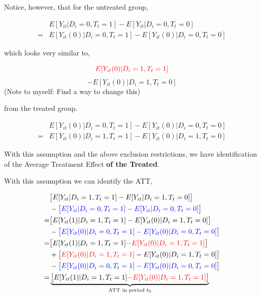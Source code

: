 \documentclass[
  letterpaper,
  DIV=11,
  numbers=noendperiod]{scrreprt}
\theoremstyle{definition}
\theoremstyle{remark}
\begin{document}
\begin{enumerate}
  Notice, however, that for the untreated group,

  \[
  \begin{aligned}
  &E[Y_{it}|D_i=0,T_t=1]-E[Y_{it}|D_i=0,T_t=0] \\
  =&E[Y_{it}(0)|D_i=0,T_t=1]-E[Y_{it}(0)|D_i=0,T_t=0]
  \end{aligned}
  \]

  which looks very similar to,

  \[
  \color{red}{E[Y_{it}(0)|D_i=1,T_t=1]}
  \] \[
  -E[Y_{it}(0)|D_i=1,T_t=0]
  \] (Note to myself: Find a way to change this)

  from the treated group.

  \begin{tcolorbox}[enhanced jigsaw, bottomrule=.15mm, coltitle=black, arc=.35mm, left=2mm, opacityback=0, leftrule=.75mm, colbacktitle=quarto-callout-note-color!10!white, title={Parallel Trends Assumption (General version)}, toprule=.15mm, bottomtitle=1mm, breakable, colframe=quarto-callout-note-color-frame, opacitybacktitle=0.6, titlerule=0mm, colback=white, rightrule=.15mm, toptitle=1mm]

  \[
  \begin{aligned}
  &E[Y_{it}(0)|D_i=0,T_t=1]-E[Y_{it}(0)|D_i=0,T_t=0] \\
  =&E[Y_{it}(0)|D_i=1,T_t=1]-E[Y_{it}(0)|D_i=1,T_t=0]
  \end{aligned}
  \]

  \end{tcolorbox}

  With this assumption and the above exclusion restrictions, we have
  identification of the Average Treatment Effect \textbf{of the
  Treated}.

  With this assumption we can identify the ATT,

  \[
  \begin{aligned}
  &\big[E[Y_{it}|D_i=1,T_t=1]-E[Y_{it}|D_i=1,T_t=0]\big]\\
  &-\big[\textcolor{blue}{E[Y_{it}|D_i=0,T_t=1]-E[Y_{it}|D_i=0,T_t=0]}\big] \\
  =&\big[E[Y_{it}(1)|D_i=1,T_t=1]-E[Y_{it}(0)|D_i=1,T_t=0]\big] \\
  &-\big[\textcolor{blue}{E[Y_{it}(0)|D_i=0,T_t=1]-E[Y_{it}(0)|D_i=0,T_t=0]}\big] \\
  =&\big[E[Y_{it}(1)|D_i=1,T_t=1]\textcolor{red}{-E[Y_{it}(0)|D_i=1,T_t=1]}\big] \\
  &+\big[\textcolor{red}{E[Y_{it}(0)|D_i=1,T_t=1]}-E[Y_{it}(0)|D_i=1,T_t=0]\big] \\
  &-\big[\textcolor{blue}{E[Y_{it}(0)|D_i=0,T_t=1]-E[Y_{it}(0)|D_i=0,T_t=0]}\big] \\
  =&\underbrace{\big[E[Y_{it}(1)|D_i=1,T_t=1]\textcolor{red}{-E[Y_{it}(0)|D_i=1,T_t=1]}\big]}_{\text{ATT in period } t_0}
  \end{aligned}
  \]


\end{enumerate}
\end{document}
